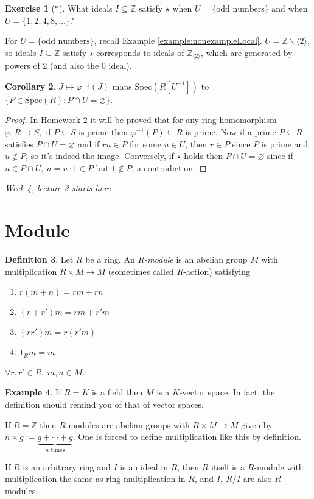 \documentclass[a4paper]{article}
\newcommand{\Spec}{\text{Spec}}
\theoremstyle{definition}
\newtheorem{defn}{Definition}[subsection]
\newtheorem{coro}[defn]{Corollary}
\newtheorem{example}[defn]{Example}
\newtheorem{exe}[defn]{Exercise}
\begin{document}
\begin{exe}[$\ast$]
What ideals $I\subseteq \mathbb Z$ satisfy $\star$ when $U=\{\text{odd numbers}\}$ and when $U=\{1,2,4,8,\ldots\}$?

For $U=\{\text{odd numbers}\}$, recall Example \ref{example:nonexampleLocal}. $U=\mathbb Z\backslash \langle2\rangle$, so ideals $I\subseteq \mathbb Z$ satisfy $\star$ corresponds to ideals of $\mathbb Z_{\langle 2\rangle}$, which are generated by powers of 2 (and also the 0 ideal).
\end{exe}

\begin{coro}
$J\mapsto \varphi^{-1}(J)$ maps $\Spec(R[U^{-1}])$ to $\{P\in\Spec(R):P\cap U=\varnothing\}$.
\end{coro}

\begin{proof}
In Homework 2 it will be proved that for any ring homomorphism $\varphi:R\rightarrow S,$ if $P\subseteq S$ is prime then $\varphi^{-1}(P)\subseteq R$ is prime. Now if a prime $P\subseteq R$ satisfies $P\cap U=\varnothing$ and if $ru\in P$ for some $u\in U$, then $r\in P$ since $P$ is prime and $u\notin P$, so it's indeed the image. Conversely, if $\star$ holds then $P\cap U=\varnothing$ since if $u\in P\cap U,\ u=u\cdot 1\in P$ but $1\notin P$, a contradiction.
\end{proof}

\begin{flushright}
\textit{Week 4, lecture 3 starts here}
\end{flushright}

\section{Module}
\begin{defn}
Let $R$ be a ring. An $R$\textit{-module} is an abelian group $M$ with multiplication $R\times M\rightarrow M$ (sometimes called $R$-action) satisfying
\begin{enumerate}
\item $r(m+n)=rm+rn$ 
\item $(r+r')m=rm+r'm$
\item $(rr')m=r(r'm)$
\item $1_R m=m$
\end{enumerate}
$\forall r,r'\in R,\ m,n\in M$.
\end{defn}

\begin{example}
If $R=K$ is a field then $M$ is a $K$-vector space. In fact, the definition should remind you of that of vector spaces.

If $R=\mathbb Z$ then $R$-modules are abelian groups with $R\times M\rightarrow M$ given by $n\times g:=\underbrace{g+\cdots+g}_{n\text{ times}}$. One is forced to define multiplication like this by definition.

If $R$ is an arbitrary ring and $I$ is an ideal in $R$, then $R$ itself is a $R$-module with multiplication the same as ring multiplication in $R$, and $I,\ R/I$ are also $R$-modules.
\end{example}
\end{document}
